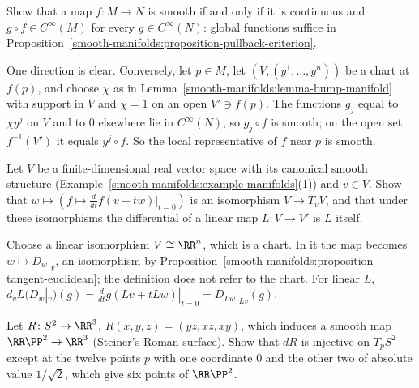 \begin{exercise}\label{smooth-manifolds:exercise-smooth-via-functions}
Show that a map $f \colon M \to N$ is smooth if and only if it is continuous and $g \circ f \in C^\infty(M)$ for every $g \in C^\infty(N)$: global functions
suffice in Proposition~\ref{smooth-manifolds:proposition-pullback-criterion}.
\end{exercise}

\begin{solution}
One direction is clear. Conversely, let $p \in M$, let $(V, (y^1, \ldots, y^n))$ be a chart at $f(p)$, and choose $\chi$ as in
Lemma~\ref{smooth-manifolds:lemma-bump-manifold} with support in $V$ and $\chi = 1$ on an open $V' \ni f(p)$. The functions $g_j$ equal to $\chi y^j$ on $V$ and to $0$
elsewhere lie in $C^\infty(N)$, so $g_j \circ f$ is smooth; on the open set $f^{-1}(V')$ it equals $y^j \circ f$. So the local representative of $f$ near $p$ is
smooth.
\end{solution}

\begin{exercise}\label{smooth-manifolds:exercise-tangent-vector-space}
Let $V$ be a finite-dimensional real vector space with its canonical smooth structure (Example~\ref{smooth-manifolds:example-manifolds}(1)) and $v \in V$. Show
that $w \mapsto (f \mapsto \frac{d}{dt}f(v + tw)|_{t=0})$ is an isomorphism $V \to T_vV$, and that under these isomorphisms the differential of a linear map
$L \colon V \to V'$ is $L$ itself.
\end{exercise}

\begin{solution}
Choose a linear isomorphism $V \cong \RR^n$, which is a chart. In it the map becomes $w \mapsto D_w|_v$, an isomorphism by
Proposition~\ref{smooth-manifolds:proposition-tangent-euclidean}; the definition does not refer to the chart. For linear $L$,
$d_vL(D_w|_v)(g) = \frac{d}{dt}g(Lv + tLw)|_{t=0} = D_{Lw}|_{Lv}(g)$.
\end{solution}

\begin{exercise}\label{smooth-manifolds:exercise-roman-surface}
Let $R \colon S^2 \to \RR^3$, $R(x, y, z) = (yz, xz, xy)$, which induces a smooth map $\RR\PP^2 \to \RR^3$ (Steiner's Roman surface). Show that $dR$ is injective on $T_pS^2$ except at the twelve points $p$ with one coordinate
$0$ and the other two of absolute value $1/\sqrt2$, which give six points of $\RR\PP^2$.
\end{exercise}

